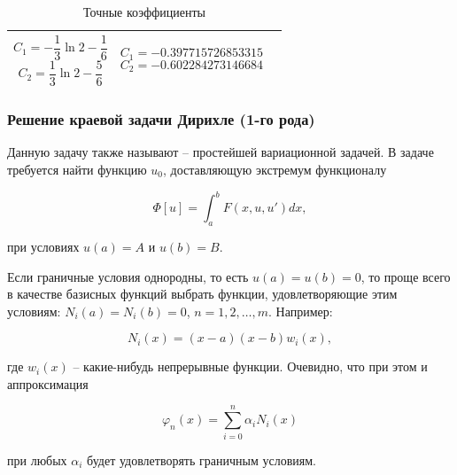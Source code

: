 \begin{table}[!h]
\begin{tabular}{|c|c|c|}
	\parbox[c]{3cm}{
		 \begin{displaymath}
			 C_{1} = - \frac{1}{3} \ln{2} - \frac{1}{6} 
		 \end{displaymath}
		\begin{displaymath} 	
			 C_{2} = \frac{1}{3} \ln{2} - \frac{5}{6}
		 \end{displaymath}
		 } & 
		 
	\parbox[c]{4.07cm}{
		 \begin{displaymath}
			 C_{1} = -0.397715726853315
		 \end{displaymath}
		 \begin{displaymath}
			 C_{2} = -0.602284273146684
		 \end{displaymath}
		 }\\	\hline
	\end{tabular}
	\caption{Точные коэффициенты}
	\label{table_exact_coefficients}
\end{table}

\subsubsection{Решение краевой задачи Дирихле (1-го рода)}

Данную задачу также называют -- простейшей вариационной задачей. В задаче требуется найти функцию $u_{0}$, доставляющую экстремум функционалу

\begin{displaymath}
	\Phi[u] = \int_{a}^{b} F(x, u, u')dx,
\end{displaymath}

\noindent при условиях $u(a) = A$ и $u(b) = B$.

Если граничные условия однородны, то есть $u(a) = u(b) = 0$, то проще всего в качестве базисных функций выбрать функции, удовлетворяющие этим условиям: $N_{i}(a) = N_{i}(b) = 0$, $n = 1, 2, \ldots, m$. Например:

\begin{displaymath}
	N_{i}(x) = (x-a)(x-b)w_{i}(x),
\end{displaymath}

\noindent где $w_{i}(x)$ -- какие-нибудь непрерывные функции. Очевидно, что при этом и аппроксимация 

\begin{displaymath}
	\varphi_{n}(x) = \sum_{i=0}^n \alpha_{i}N_{i}(x)
\end{displaymath}

\noindent при любых $\alpha_{i}$ будет удовлетворять граничным условиям.

